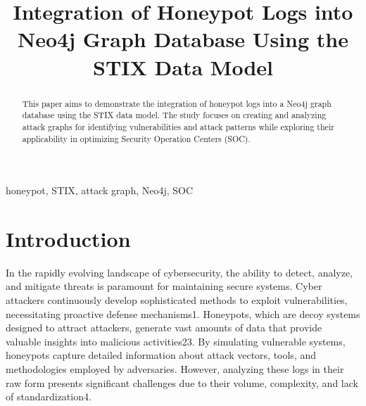 \documentclass[conference]{IEEEtran}
\begin{document}
\title{Integration of Honeypot Logs into Neo4j Graph Database Using the STIX Data Model}

\author{
\and
{}
}

\maketitle

\begin{abstract}
This paper aims to demonstrate the integration of honeypot logs into a Neo4j graph database using the STIX data model. The study focuses on creating and analyzing attack graphs for identifying vulnerabilities and attack patterns while exploring their applicability in optimizing Security Operation Centers (SOC).
\end{abstract}

\begin{IEEEkeywords}
honeypot, STIX, attack graph, Neo4j, SOC
\end{IEEEkeywords}

\section{Introduction\cite{openai2024chatgpt}}

In the rapidly evolving landscape of cybersecurity, the ability to detect, analyze, and mitigate threats is paramount for maintaining secure systems. Cyber attackers continuously develop sophisticated methods to exploit vulnerabilities, necessitating proactive defense mechanisms1. Honeypots, which are decoy systems designed to attract attackers, generate vast amounts of data that provide valuable insights into malicious activities23. By simulating vulnerable systems, honeypots capture detailed information about attack vectors, tools, and methodologies employed by adversaries. However, analyzing these logs in their raw form presents significant challenges due to their volume, complexity, and lack of standardization4.
\end{document}
